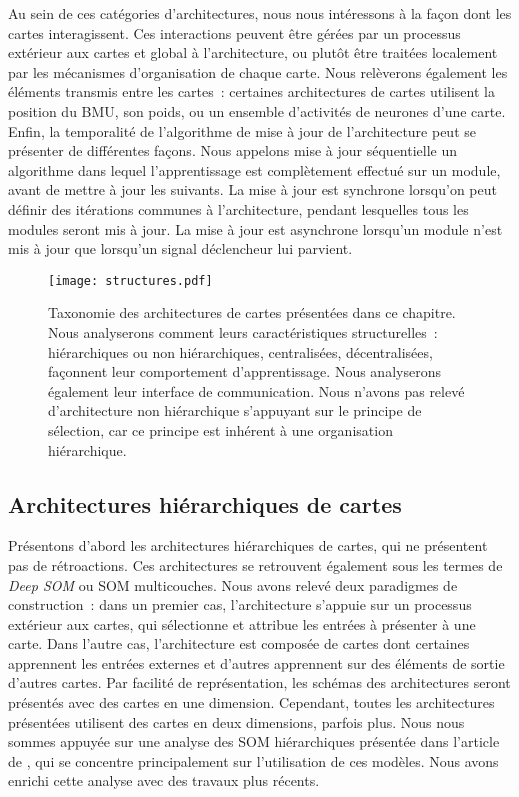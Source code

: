 \documentclass[../main]{subfiles}
\begin{document}
Au sein de ces catégories d'architectures, nous nous intéressons à la façon dont les cartes interagissent.
Ces interactions peuvent être gérées par un processus extérieur aux cartes et global à l'architecture, ou plutôt être traitées localement par les mécanismes d'organisation de chaque carte.
Nous relèverons également les éléments transmis entre les cartes~:
certaines architectures de cartes utilisent la position du BMU, son poids, ou un ensemble d'activités de neurones d'une carte.
Enfin, la temporalité de l'algorithme de mise à jour de l'architecture peut se présenter de différentes façons. Nous appelons mise à jour séquentielle un algorithme dans lequel l'apprentissage est complètement effectué sur un module, avant de mettre à jour les suivants. La mise à jour est synchrone lorsqu'on peut définir des itérations communes à l'architecture, pendant lesquelles tous les modules seront mis à jour. La mise à jour est asynchrone lorsqu'un module n'est mis à jour que lorsqu'un signal déclencheur lui parvient.

\begin{figure}
\centering\texttt{[image: structures.pdf]}
\caption{Taxonomie des architectures de cartes présentées dans ce chapitre. Nous analyserons comment leurs caractéristiques structurelles~: hiérarchiques ou non hiérarchiques, centralisées, décentralisées, façonnent leur comportement d'apprentissage. Nous analyserons également leur interface de communication. Nous n'avons pas relevé d'architecture non hiérarchique s'appuyant sur le principe de sélection, car ce principe est inhérent à une organisation hiérarchique. \label{fig:taxo}}
\end{figure}

\subsection{Architectures hiérarchiques de cartes}

Présentons d'abord les architectures hiérarchiques de cartes, qui ne présentent pas de rétroactions. Ces architectures se retrouvent également sous les termes de \emph{Deep SOM} ou SOM multicouches.
Nous avons relevé deux paradigmes de construction~: dans un premier cas, l'architecture s'appuie sur un processus extérieur aux cartes, qui sélectionne et attribue les entrées à présenter à une carte.
Dans l'autre cas, l'architecture est composée de cartes dont certaines apprennent les entrées externes et d'autres apprennent sur des éléments de sortie d'autres cartes.
Par facilité de représentation, les schémas des architectures seront présentés avec des cartes en une dimension. Cependant, toutes les architectures présentées utilisent des cartes en deux dimensions, parfois plus.
Nous nous sommes appuyée sur une analyse des SOM hiérarchiques présentée dans l'article de \cite{henriques_spatial_2012}, qui se concentre principalement sur l'utilisation de ces modèles.
Nous avons enrichi cette analyse avec des travaux plus récents.
\end{document}
